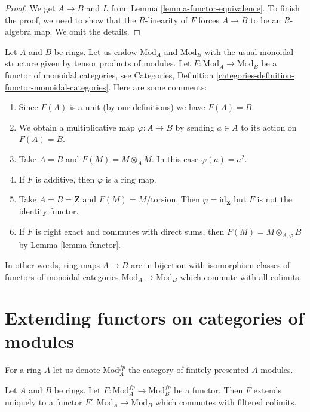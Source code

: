 \begin{proof}
We get $A \to B$ and $L$ from Lemma \ref{lemma-functor-equivalence}.
To finish the proof, we need to show that the $R$-linearity
of $F$ forces $A \to B$ to be an $R$-algebra map. We omit the details.
\end{proof}

\begin{remark}
\label{remark-monoidal}
Let $A$ and $B$ be rings. Let us endow $\text{Mod}_A$ and $\text{Mod}_B$
with the usual monoidal structure given by tensor products of modules.
Let $F : \text{Mod}_A \to \text{Mod}_B$ be a functor of
monoidal categories, see
Categories, Definition \ref{categories-definition-functor-monoidal-categories}.
Here are some comments:
\begin{enumerate}
\item Since $F(A)$ is a unit (by our definitions) we have $F(A) = B$.
\item We obtain a multiplicative map $\varphi : A \to B$
by sending $a \in A$ to its action on $F(A) = B$.
\item Take $A = B$ and $F(M) = M \otimes_A M$. In this case $\varphi(a) = a^2$.
\item If $F$ is additive, then $\varphi$ is a ring map.
\item Take $A = B = \mathbf{Z}$ and $F(M) = M/\text{torsion}$. Then
$\varphi = \text{id}_\mathbf{Z}$ but $F$ is not the identity functor.
\item If $F$ is right exact and commutes with direct sums,
then $F(M) = M \otimes_{A, \varphi} B$ by Lemma \ref{lemma-functor}.
\end{enumerate}
In other words, ring maps $A \to B$ are in bijection with isomorphism classes
of functors of monoidal categories $\text{Mod}_A \to \text{Mod}_B$
which commute with all colimits.
\end{remark}




\section{Extending functors on categories of modules}
\label{section-functors-extend}

\noindent
For a ring $A$ let us denote $\text{Mod}^{fp}_A$ the category of
finitely presented $A$-modules.

\begin{lemma}
\label{lemma-functor-fp-modules}
Let $A$ and $B$ be rings. Let
$F : \text{Mod}^{fp}_A \to \text{Mod}^{fp}_B$ be a functor.
Then $F$ extends uniquely to a functor
$F' : \text{Mod}_A \to \text{Mod}_B$
which commutes with filtered colimits.
\end{lemma}

